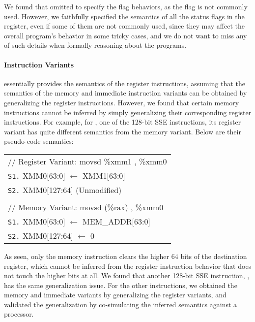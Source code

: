 We found that \Strata omitted to specify the  flag behaviors, as the flag is not commonly used.
However, we faithfully specified the semantics of all the status flags in the  register, even if some of them are not commonly used, since they may affect the overall program's behavior in some tricky cases, and we do not want to miss any of such details when formally reasoning about the \ISA programs.





\paragraph{Instruction Variants}

\Strata essentially provides the semantics of the register instructions, assuming that the semantics of the memory and immediate instruction variants can be obtained by generalizing the register instructions.
However, we found that certain memory instructions cannot be inferred by simply generalizing their corresponding register instructions.
%
For example, for , one of the 128-bit SSE instructions, its register variant has quite different semantics from the memory variant.
Below are their pseudo-code semantics:
{
\small
\begin{center}
\begin{tabular}[b]{l}
   // Register Variant: movsd \%xmm1  , \%xmm0 \\ 
   {\tt S1.} XMM0[63:0] $\leftarrow$ XMM1[63:0] \\ 
   {\tt S2.} XMM0[127:64] (Unmodified) \\
   \\
   // Memory Variant: movsd  (\%rax) , \%xmm0 \\
   {\tt S1.} XMM0[63:0] $\leftarrow$ MEM\_ADDR[63:0] \\
   {\tt S2.} XMM0[127:64] $\leftarrow$ 0
\end{tabular}
\end{center}
}
\noindent As seen, only the memory instruction clears the higher 64 bits of the destination register, which cannot be inferred from the register instruction behavior that does not touch the higher bits at all.
%
We found that another 128-bit SSE instruction, , has the same generalization issue.
%
For the other instructions, we obtained the memory and immediate variants by generalizing the register variants, and validated the generalization by co-simulating the inferred semantics against a processor.


